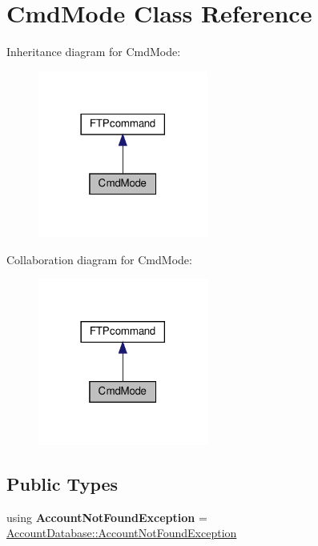 \hypertarget{classCmdMode}{}\section{Cmd\+Mode Class Reference}
\label{classCmdMode}


Inheritance diagram for Cmd\+Mode\+:
\nopagebreak
\begin{figure}[H]
\begin{center}
\leavevmode
\includegraphics[width=158pt]{classCmdMode__inherit__graph}
\end{center}
\end{figure}


Collaboration diagram for Cmd\+Mode\+:
\nopagebreak
\begin{figure}[H]
\begin{center}
\leavevmode
\includegraphics[width=158pt]{classCmdMode__coll__graph}
\end{center}
\end{figure}
\subsection*{Public Types}
\begin{DoxyCompactItemize}
\item 
\mbox{\label{classCmdMode_ad8aa7ec04fa921d1036cd2568dbe15a0}} 
using {\bfseries Account\+Not\+Found\+Exception} = \hyperlink{structAccountDatabase_1_1AccountNotFoundException}{Account\+Database\+::\+Account\+Not\+Found\+Exception}
\end{DoxyCompactItemize}
